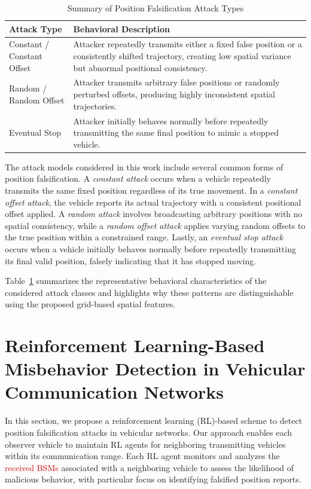 \documentclass[conference]{IEEEtran}
\begin{document}
\begin{table}[htbp]
\caption{Summary of Position Falsification Attack Types}
\centering
\renewcommand{\arraystretch}{1.2}
\begin{tabular}{|p{2.1cm}|p{5.8cm}|}
\hline
\textbf{Attack Type} & \textbf{Behavioral Description} \\ \hline
Constant / Constant Offset & Attacker repeatedly transmits either a fixed false position or a consistently shifted trajectory, creating low spatial variance but abnormal positional consistency. \\ \hline
Random / Random Offset & Attacker transmits arbitrary false positions or randomly perturbed offsets, producing highly inconsistent spatial trajectories. \\ \hline
Eventual Stop & Attacker initially behaves normally before repeatedly transmitting the same final position to mimic a stopped vehicle. \\ \hline
\end{tabular}
\label{tab:attack_summary}
\end{table}

The attack models considered in this work include several common forms of position falsification. A \textit{constant attack} occurs when a vehicle repeatedly transmits the same fixed position regardless of its true movement. In a \textit{constant offset attack}, the vehicle reports its actual trajectory with a consistent positional offset applied. A \textit{random attack} involves broadcasting arbitrary positions with no spatial consistency, while a \textit{random offset attack} applies varying random offsets to the true position within a constrained range. Lastly, an \textit{eventual stop attack} occurs when a vehicle initially behaves normally before repeatedly transmitting its final valid position, falsely indicating that it has stopped moving.

Table~\ref{tab:attack_summary} summarizes the representative behavioral characteristics of the considered attack classes and highlights why these patterns are distinguishable using the proposed grid-based spatial features.



\section{Reinforcement Learning-Based Misbehavior Detection in Vehicular Communication Networks}


In this section, we propose a reinforcement learning (RL)-based scheme to detect position falsification attacks in vehicular networks. Our approach enables each observer vehicle to maintain RL agents for neighboring transmitting vehicles within its communication range. Each RL agent monitors and analyzes the \textcolor{red}{received BSMs} associated with a neighboring vehicle to assess the likelihood of malicious behavior, with particular focus on identifying falsified position reports.
\end{document}
